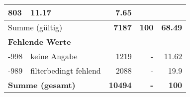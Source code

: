 \begin{longtable}{lXrrr}
       \num{803} &
       \num[round-mode=places,round-precision=2]{11,17} &
         \num[round-mode=places,round-precision=2]{7,65} \\
     \midrule
     \multicolumn{2}{l}{Summe (gültig)} &
       \textbf{\num{7187}} &
     \textbf{100} &
       \textbf{\num[round-mode=places,round-precision=2]{68,49}} \\
     \multicolumn{5}{l}{\textbf{Fehlende Werte}}\\
       -998 &
       keine Angabe &
         \num{1219} &
        - &
         \num[round-mode=places,round-precision=2]{11,62} \\
       -989 &
       filterbedingt fehlend &
         \num{2088} &
        - &
         \num[round-mode=places,round-precision=2]{19,9} \\
     \midrule
     \multicolumn{2}{l}{\textbf{Summe (gesamt)}} &
          \textbf{\num{10494}} &
        \textbf{-} &
        \textbf{100} \\
     \bottomrule
     \end{longtable}
     
